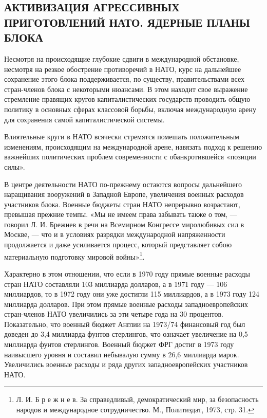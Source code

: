 \documentclass[12pt, a4paper, openany]{book}
\begin{document}
		\subsection[Активизация агрессивных приготовлений НАТО. Ядерные планы блока]{\center АКТИВИЗАЦИЯ АГРЕССИВНЫХ ПРИГОТОВЛЕНИЙ НАТО. ЯДЕРНЫЕ ПЛАНЫ БЛОКА}	
	
	
	Несмотря на происходящие глубокие сдвиги в международной обстановке, несмотря на резкое обострение противоречий в НАТО, курс на дальнейшее сохранение этого блока поддерживается, по существу, правительствами всех стран-членов блока с некоторыми нюансами. В этом находит свое выражение стремление правящих кругов капиталистических государств проводить общую политику в основных сферах классовой борьбы, включая международную арену для сохранения самой капиталистической системы.
	
	Влиятельные круги в НАТО всячески стремятся помешать положительным изменениям, происходящим на международной арене, навязать подход к решению важнейших политических проблем современности с обанкротившейся «позиции силы».
	
	В центре деятельности НАТО по-прежнему остаются вопросы дальнейшего наращивания вооружений в Западной Европе, увеличения военных расходов участников блока. Военные бюджеты стран НАТО непрерывно возрастают, превышая прежние темпы. «Мы не имеем права забывать также о том, — говорил Л. И. Брежнев в речи на Всемирном Конгрессе миролюбивых сил в Москве, — что и в условиях разрядки международной напряженности продолжается и даже усиливается процесс, который представляет собою материальную подготовку мировой войны»{\footnote{Л. И. Б р е ж н е в. За справедливый, демократический мир, за безопасность народов и международное сотрудничество. М., Политиздат, 1973, стр. 31.}}.
	
	Характерно в этом отношении, что если в 1970 году прямые военные расходы стран НАТО составляли 103 миллиарда долларов, а в 1971 году — 106 миллиардов, то в 1972 году они уже достигли 115 миллиардов, а в 1973 году 124 миллиарда долларов. При этом прямые военные расходы западноевропейских стран-членов НАТО увеличились за эти четыре года на 30 процентов. Показательно, что военный бюджет Англии на 1973/74 финансовый год был доведен до 3,4 миллиарда фунтов стерлингов, что означает увеличение на 0,5 миллиарда фунтов стерлингов. Военный бюджет ФРГ достиг в 1973 году наивысшего уровня и составил небывалую сумму в 26,6 миллиарда марок. Увеличились военные расходы и ряда других западноевропейских участников НАТО.
	
\end{document}
